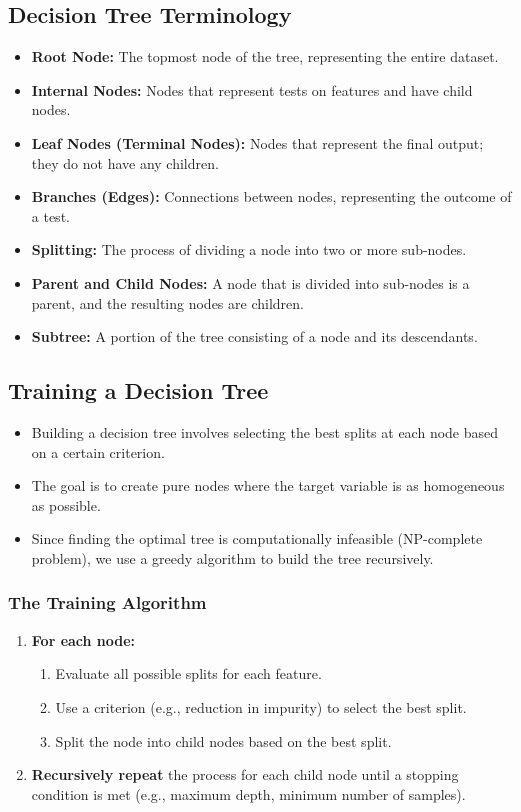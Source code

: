 \documentclass{article}
\begin{document}
\subsection{Decision Tree Terminology}

\begin{itemize}
    \item \textbf{Root Node:} The topmost node of the tree, representing the entire dataset.
    \item \textbf{Internal Nodes:} Nodes that represent tests on features and have child nodes.
    \item \textbf{Leaf Nodes (Terminal Nodes):} Nodes that represent the final output; they do not have any children.
    \item \textbf{Branches (Edges):} Connections between nodes, representing the outcome of a test.
    \item \textbf{Splitting:} The process of dividing a node into two or more sub-nodes.
    \item \textbf{Parent and Child Nodes:} A node that is divided into sub-nodes is a parent, and the resulting nodes are children.
    \item \textbf{Subtree:} A portion of the tree consisting of a node and its descendants.
\end{itemize}

\subsection{Training a Decision Tree}

\begin{itemize}
    \item Building a decision tree involves selecting the best splits at each node based on a certain criterion.
    \item The goal is to create pure nodes where the target variable is as homogeneous as possible.
    \item Since finding the optimal tree is computationally infeasible (NP-complete problem), we use a greedy algorithm to build the tree recursively.
\end{itemize}

\subsubsection{The Training Algorithm}

\begin{enumerate}
    \item \textbf{For each node:}
    \begin{enumerate}
        \item Evaluate all possible splits for each feature.
        \item Use a criterion (e.g., reduction in impurity) to select the best split.
        \item Split the node into child nodes based on the best split.
    \end{enumerate}
    \item \textbf{Recursively repeat} the process for each child node until a stopping condition is met (e.g., maximum depth, minimum number of samples).
\end{enumerate}
\end{document}
